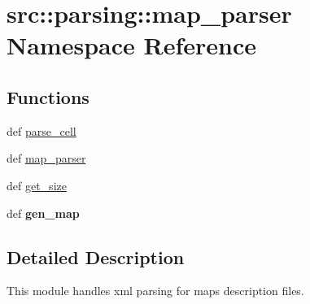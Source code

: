 \hypertarget{namespacesrc_1_1parsing_1_1map__parser}{\section{src\-:\-:parsing\-:\-:map\-\_\-parser \-Namespace \-Reference}
\label{namespacesrc_1_1parsing_1_1map__parser}
}
\subsection*{\-Functions}
\begin{DoxyCompactItemize}
\item 
def \hyperlink{namespacesrc_1_1parsing_1_1map__parser_aac6741d64e3c2b22acfa9fb17f4a86a2}{parse\-\_\-cell}
\item 
def \hyperlink{namespacesrc_1_1parsing_1_1map__parser_a25f5d209c73921d3c5c35b84ef775c5c}{map\-\_\-parser}
\item 
def \hyperlink{namespacesrc_1_1parsing_1_1map__parser_a5cca71476eb49fb18ef9a24eb12e9ff9}{get\-\_\-size}
\item 
\hypertarget{namespacesrc_1_1parsing_1_1map__parser_a1c832223a925c33788584c793b07d267}{def {\bfseries gen\-\_\-map}}\label{namespacesrc_1_1parsing_1_1map__parser_a1c832223a925c33788584c793b07d267}

\end{DoxyCompactItemize}


\subsection{\-Detailed \-Description}
\begin{DoxyVerb}
This module handles xml parsing for maps description files.
\end{DoxyVerb}
 

